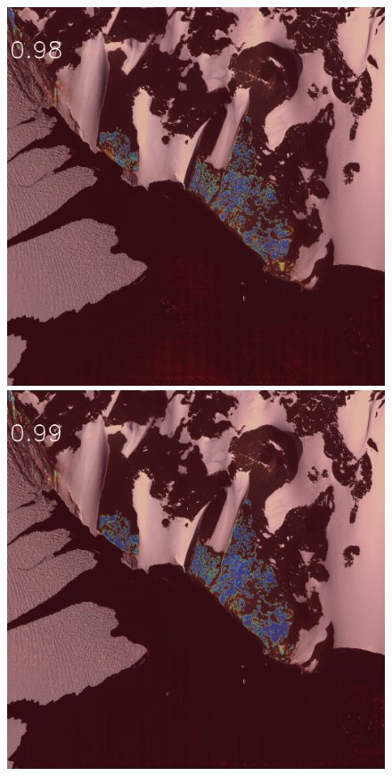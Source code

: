 \begin{figure}[h]
\includegraphics[width=\subFigx]{./fig/datagrow/MSE_single_unet_train_0_3.txt_bias-1_bs128_do0.1e25/WV02_20110131195115_1030010009CCF900_11JAN31195115-M1BS-052549143040_01_P003_u08rf3031.png}
\includegraphics[width=\subFigx]{./fig/datagrow/MSE_single_unet_train_0_4.txt_bias-1_bs128_do0.1e25/WV02_20110131195115_1030010009CCF900_11JAN31195115-M1BS-052549143040_01_P003_u08rf3031.png}



\end{figure}
